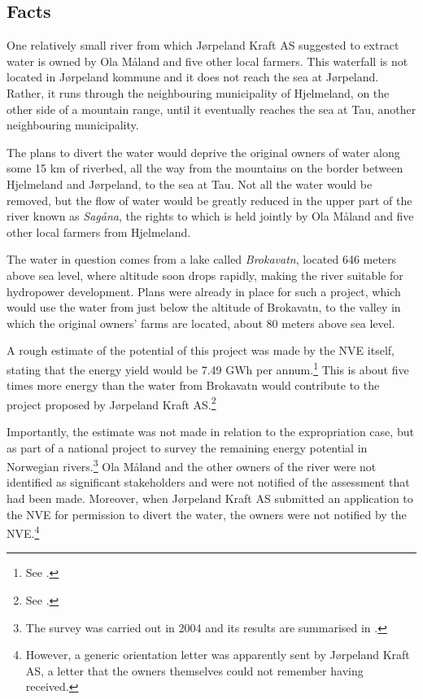 \subsection{Facts}

One relatively small river from which Jørpeland Kraft AS suggested to extract water is owned by Ola Måland and five other local farmers. This waterfall is not located in Jørpeland kommune and it does not reach the sea at Jørpeland. Rather, it runs through the neighbouring municipality of Hjelmeland, on the other side of a mountain range, until it eventually reaches the sea at Tau, another neighbouring municipality. 

The plans to divert the water would deprive the original owners of water along some 15 km of riverbed, all the way from the mountains on the border between Hjelmeland and Jørpeland, to the sea at Tau. Not all the water would be removed, but the flow of water would be greatly reduced in the upper part of the river known as {\it Sagåna}, the rights to which is held jointly by Ola Måland and five other local farmers from Hjelmeland.

The water in question comes from a lake called \emph{Brokavatn}, located 646 meters above sea level, where altitude soon drops rapidly, making the river suitable for hydropower development. Plans were already in place for such a project, which would use the water from just below the altitude of Brokavatn, to the valley in which the original owners' farms are located, about 80 meters above sea level. 

A rough estimate of the potential of this project was made by the NVE itself, stating that the energy yield would be 7.49 GWh per annum.\footnote{See \cite{jorpeland09}.} This is about five times more energy than the water from Brokavatn would contribute to the project proposed by Jørpeland Kraft AS.\footnote{See \cite{jorpeland09}.}

Importantly, the estimate was not made in relation to the expropriation case, but as part of a national project to survey the remaining energy potential in Norwegian rivers.\footnote{The survey was carried out in 2004 and its results are summarised in \cite{jensen04}.} Ola Måland and the other owners of the river were not identified as significant stakeholders and were not notified of the assessment that had been made. Moreover, when Jørpeland Kraft AS submitted an application to the NVE for permission to divert the water, the owners were not notified by the NVE.\footnote{However, a generic orientation letter was apparently sent by Jørpeland Kraft AS, a letter that the owners themselves could not remember having received.}

